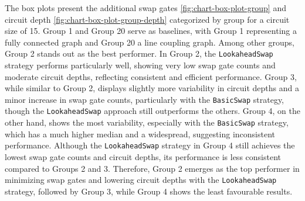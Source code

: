The box plots present the additional swap gates \ref{fig:chart-box-plot-group} and circuit depth \ref{fig:chart-box-plot-group-depth} categorized by group for a circuit size of 15.  Group 1 and Group 20 serve as baselines, with Group 1 representing a fully connected graph and Group 20 a line coupling graph. Among other groups, Group 2 stands out as the best performer. In Group 2, the \lstinline{LookaheadSwap} strategy performs particularly well, showing very low swap gate counts and moderate circuit depths, reflecting consistent and efficient performance. Group 3, while similar to Group 2, displays slightly more variability in circuit depths and a minor increase in swap gate counts, particularly with the \lstinline{BasicSwap} strategy, though the \lstinline{LookaheadSwap} approach still outperforms the others. Group 4, on the other hand, shows the most variability, especially with the \lstinline{BasicSwap} strategy, which has a much higher median and a widespread, suggesting inconsistent performance. Although the \lstinline{LookaheadSwap} strategy in Group 4 still achieves the lowest swap gate counts and circuit depths, its performance is less consistent compared to Groups 2 and 3. Therefore, Group 2 emerges as the top performer in minimizing swap gates and lowering circuit depths with the \lstinline{LookaheadSwap} strategy, followed by Group 3, while Group 4 shows the least favourable results. \\
